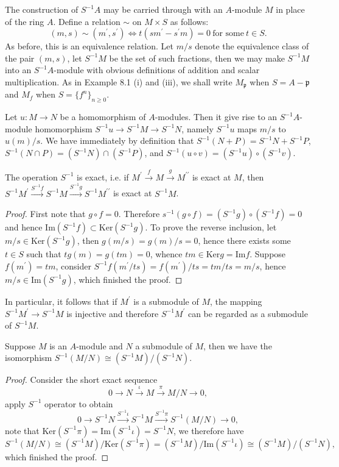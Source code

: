 The construction of $S^{-1}A$ may be carried through with an $A$-module $M$ in place of the ring $A$. Define a relation $\sim$ on $M\times S$ as follows: 
$$(m,s)\sim (m^\prime,s^\prime)\iff t(sm^\prime-s^\prime m)=0\ \text{for some}\ t\in S.$$
As before, this is an equivalence relation. Let $m/s$ denote the equivalence class of the pair $(m,s)$, let $S^{-1}M$ be the set of such fractions, then we may make $S^{-1}M$ into an $S^{-1}A$-module with obvious definitions of addition and scalar multiplication. As in Example 8.1 (i) and (iii), we shall write $M_\mathfrak{p}$ when $S=A-\mathfrak{p}$ and $M_f$ when $S=\{f^n\}_{n\ge 0}$.\par
Let $u:M\to N$ be a homomorphism of $A$-modules. Then it give rise to an $S^{-1}A$-module homomorphism $S^{-1}u\to S^{-1}M\to S^{-1}N$, namely $S^{-1}u$ maps $m/s$ to $u(m)/s$. We have immediately by definition that $S^{-1}(N+P)=S^{-1}N+S^{-1}P$, $S^{-1}(N\cap P)=(S^{-1}N)\cap(S^{-1}P)$, and $S^{-1}(u\circ v)=(S^{-1}u)\circ(S^{-1}v)$.
\begin{proposition}
The operation $S^{-1}$ is exact, i.e. if $M^{\prime}\overset{f}{\longrightarrow}M\overset{g}{\longrightarrow}M^{\prime\prime}$ is exact at $M$, then $S^{-1}M^{\prime}\overset{S^{-1}f}{\longrightarrow}S^{-1}M\overset{S^{-1}g}{\longrightarrow}S^{-1}M^{\prime\prime}$ is exact at $S^{-1}M$.
\end{proposition}
\begin{proof}
First note that $g\circ f=0$. Therefore $s^{-1}(g\circ f)=(S^{-1}g)\circ(S^{-1}f)=0$ and hence $\mathrm{Im}(S^{-1}f)\subset\mathrm{Ker}(S^{-1}g)$. To prove the reverse inclusion, let $m/s\in\mathrm{Ker}(S^{-1}g)$, then $g(m/s)=g(m)/s=0$, hence there exists some $t\in S$ such that $tg(m)=g(tm)=0$, whence $tm\in\mathrm{Ker}g=\mathrm{Im}f$. Suppose $f(m^\prime)=tm$, consider $S^{-1}f(m^\prime/ts)=f(m^\prime)/ts=tm/ts=m/s$, hence $m/s\in\mathrm{Im}(S^{-1}g)$, which finished the proof.
\end{proof}
In particular, it follows that if $M^\prime$ is a submodule of $M$, the mapping $S^{-1}M^\prime\to S^{-1}M$ is injective and therefore $S^{-1}M^\prime$ can be regarded as a submodule of $S^{-1}M$.
\begin{corollary}
Suppose $M$ is an $A$-module and $N$ a submodule of $M$, then we have the isomorphism $S^{-1}(M/N)\cong(S^{-1}M)/(S^{-1}N)$.
\end{corollary}
\begin{proof}
Consider the short exact sequence 
$$
0\longrightarrow N\overset{\iota}{\longrightarrow}M\overset{\pi}{\longrightarrow}M/N\longrightarrow 0,
$$
apply $S^{-1}$ operator to obtain 
$$
0\longrightarrow S^{-1}N\overset{S^{-1}\iota}{\longrightarrow}S^{-1}M\overset{S^{-1}\pi}{\longrightarrow}S^{-1}\left( M/N \right) \longrightarrow 0,
$$
note that $\mathrm{Ker}(S^{-1}\pi)=\mathrm{Im}(S^{-1}\iota)=S^{-1}N$, we therefore have 
$$
S^{-1}\left( M/N \right) \cong \left( S^{-1}M \right) /\mathrm{Ker}\left( S^{-1}\pi \right) =\left( S^{-1}M \right) /\mathrm{Im}\left( S^{-1}\iota \right) \cong \left( S^{-1}M \right) /\left( S^{-1}N \right) ,
$$
which finished the proof.
\end{proof}
